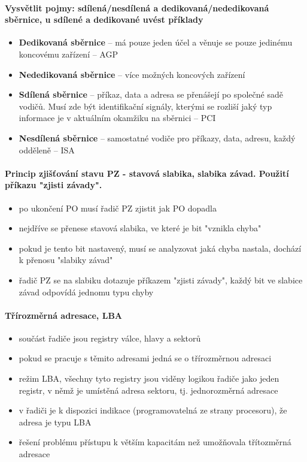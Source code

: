 \documentclass[a5paper,10pt]{article}
\begin{document}
\paragraph{Vysvětlit pojmy: sdílená/nesdílená a dedikovaná/nededikovaná sběrnice, u sdílené a dedikované uvést příklady}
\begin{itemize}
	\item \textbf{Dedikovaná sběrnice} -- má pouze jeden účel a věnuje se pouze jedinému koncovému zařízení -- AGP
	\item \textbf{Nededikovaná sběrnice} -- více možných koncových zařízení
	\item \textbf{Sdílená sběrnice} -- příkaz, data a adresa se přenášejí po společné sadě vodičů. Musí zde být identifikační signály, kterými se rozliší jaký typ informace je v aktuálním okamžiku na sběrnici -- PCI
	\item \textbf{Nesdílená sběrnice} -- samostatné vodiče pro příkazy, data, adresu, každý odděleně -- ISA
\end{itemize}

\paragraph{Princip zjišťování stavu PZ - stavová slabika, slabika závad. Použití příkazu "zjisti závady".}
\begin{itemize}
	\item po ukončení PO musí řadič PZ zjistit jak PO dopadla
	\item nejdříve se přenese stavová slabika, ve které je bit "vznikla chyba"
	\item pokud je tento bit nastavený, musí se analyzovat jaká chyba nastala, dochází k přenosu "slabiky závad"
	\item řadič PZ se na slabiku dotazuje příkazem "zjisti závady", každý bit ve slabice závad odpovídá jednomu typu chyby
\end{itemize}

\paragraph{Třírozměrná adresace, LBA}
\begin{itemize}
	\item součást řadiče jsou registry válce, hlavy a sektorů
	\item pokud se pracuje s těmito adresami jedná se o třírozměrnou adresaci
	\item režim LBA, všechny tyto registry jsou viděny logikou řadiče jako jeden registr, v němž je umístěná adresa sektoru, tj. jednorozměrná adresace
	\item v řadiči je k dispozici indikace (programovatelná ze strany procesoru), že adresa je typu LBA
	\item řešení problému přístupu k větším kapacitám než umožňovala třítozměrná adresace
\end{itemize}
\end{document}

